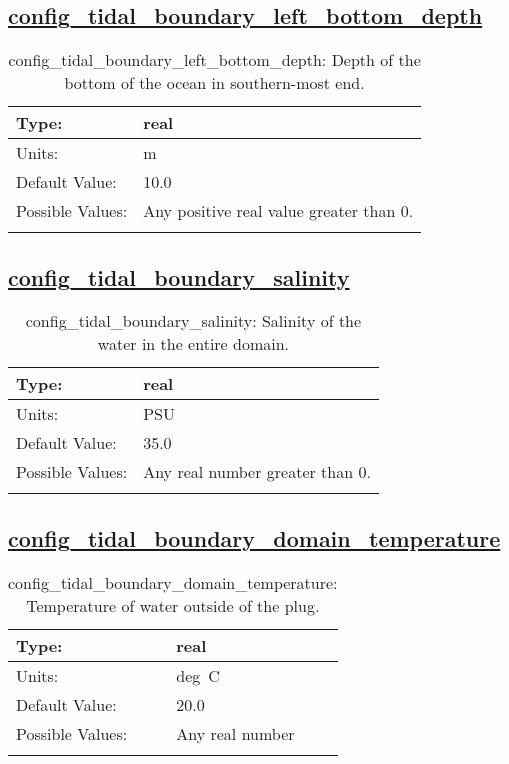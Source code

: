 \subsection[config\_tidal\_boundary\_left\_bottom\_depth]{\hyperref[sec:nm_tab_tidal_boundary]{config\_tidal\_boundary\_left\_bottom\_depth}}
\label{subsec:nm_sec_config_tidal_boundary_left_bottom_depth}
\begin{center}
\begin{longtable}{| p{2.0in} || p{4.0in} |}
    \hline
    Type: & real \\
    \hline
    Units: & \si{m} \\
    \hline
    Default Value: & 10.0 \\
    \hline
    Possible Values: & Any positive real value greater than 0. \\
    \hline
    \caption{config\_tidal\_boundary\_left\_bottom\_depth: Depth of the bottom of the ocean in southern-most end.}
\end{longtable}
\end{center}
\subsection[config\_tidal\_boundary\_salinity]{\hyperref[sec:nm_tab_tidal_boundary]{config\_tidal\_boundary\_salinity}}
\label{subsec:nm_sec_config_tidal_boundary_salinity}
\begin{center}
\begin{longtable}{| p{2.0in} || p{4.0in} |}
    \hline
    Type: & real \\
    \hline
    Units: & \si{PSU} \\
    \hline
    Default Value: & 35.0 \\
    \hline
    Possible Values: & Any real number greater than 0. \\
    \hline
    \caption{config\_tidal\_boundary\_salinity: Salinity of the water in the entire domain.}
\end{longtable}
\end{center}
\subsection[config\_tidal\_boundary\_domain\_temperature]{\hyperref[sec:nm_tab_tidal_boundary]{config\_tidal\_boundary\_domain\_temperature}}
\label{subsec:nm_sec_config_tidal_boundary_domain_temperature}
\begin{center}
\begin{longtable}{| p{2.0in} || p{4.0in} |}
    \hline
    Type: & real \\
    \hline
    Units: & \si{deg.C} \\
    \hline
    Default Value: & 20.0 \\
    \hline
    Possible Values: & Any real number \\
    \hline
    \caption{config\_tidal\_boundary\_domain\_temperature: Temperature of water outside of the plug.}
\end{longtable}
\end{center}
